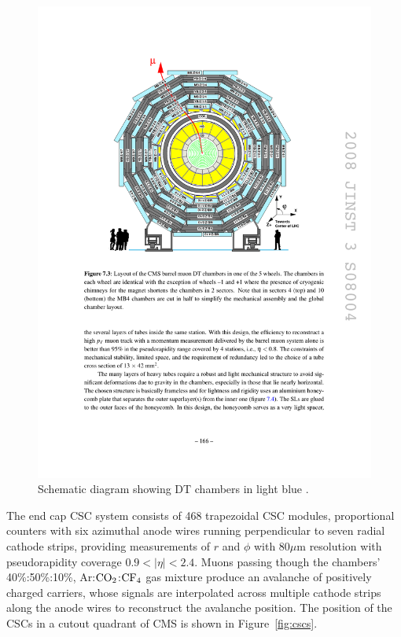\begin{figure}[tbh]
\centering
\includegraphics[width=5in]{figures/DTs.pdf}
\caption{Schematic diagram showing DT chambers in light blue \cite{1748-0221-3-08-S08004}.}
\label{fig:DTs}
\end{figure}

\indent The end cap CSC system consists of 468 trapezoidal CSC modules, proportional counters with six azimuthal anode wires running perpendicular to seven radial cathode strips, providing measurements of $r$ and $\phi$ with $80 \mu$m resolution with pseudorapidity coverage $0.9 < |\eta| < 2.4$. Muons passing though the chambers' 40\%:50\%:10\%, Ar:$\rm{CO}_2$:$\rm{CF}_4$ gas mixture produce an avalanche of positively charged carriers, whose signals are interpolated across multiple cathode strips along the anode wires to reconstruct the avalanche position. The position of the CSCs in a cutout quadrant of CMS is shown in Figure~\ref{fig:cscs}.

